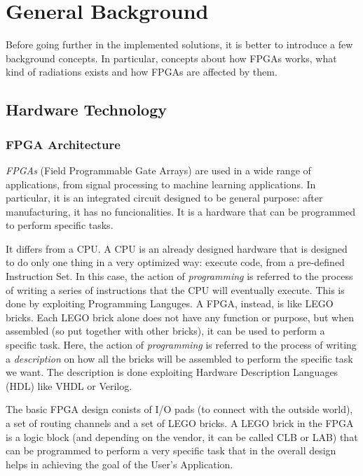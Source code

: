 \nocite{ESA:INTEGRAL}
\nocite{doi:10.1063/1.5127719}

\chapter{General Background}
\label{sec:background}

Before going further in the implemented solutions, it is better to introduce a few background concepts. In particular, concepts about how FPGAs works, what kind of radiations exists and how FPGAs are affected by them.  

\section{Hardware Technology}

\subsection{FPGA Architecture}
\label{sec:fpgaarchitecture}
\textit{FPGAs} (Field Programmable Gate Arrays) are used in a wide range of applications, from signal processing to machine learning applications. In particular, it is an integrated circuit designed to be general purpose: after manufacturing, it has no funcionalities. It is a hardware that can be programmed to perform specific tasks. \bigskip

It differs from a CPU. A CPU is an already designed hardware that is designed to do only one thing in a very optimized way: execute code, from a pre-defined Instruction Set. In this case, the action of \textit{programming} is referred to the process of writing a series of instructions that the CPU will eventually execute. This is done by exploiting Programming Languges. A FPGA, instead, is like LEGO bricks. Each LEGO brick alone does not have any function or purpose, but when assembled (so put together with other bricks), it can be used to perform a specific task. Here, the action of \textit{programming} is referred to the process of writing a \textit{description} on how all the bricks will be assembled to perform the specific task we want. The description is done exploiting Hardware Description Languages (HDL) like VHDL or Verilog. \bigskip

The basic FPGA design conists of I/O pads (to connect with the outside world), a set of routing channels and a set of LEGO bricks. A LEGO brick in the FPGA is a logic block (and depending on the vendor, it can be called CLB or LAB) that can be programmed to perform a very specific task that in the overall design helps in achieving the goal of the User's Application. 

